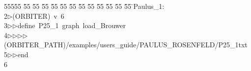 %
%
\begin{tabbing}
55555 \= 55 \= 55 \= 55 \= 55 \= 55 \= 55 \= 55 \= 55 \= 55 \= 55 \= 55 \= 55 \= \>Paulus\_1:\\[0pt]
2\>$\triangleright$\>(ORBITER)\ v\ 6\ \\[0pt]
3\>$\triangleright$\>$\triangleright$\>define\ P25\_1\ graph\ load\_Brouwer\ \\[0pt]
4\>$\triangleright$\>$\triangleright$\>$\triangleright$\>$\triangleright$\>(ORBITER\_PATH)/examples/users\_guide/PAULUS\_ROSENFELD/P25\_1txt\ \\[0pt]
5\>$\triangleright$\>$\triangleright$\>end\\[0pt]
6\>\end{tabbing}
